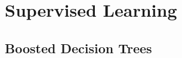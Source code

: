 

\section{Supervised Learning}
\label{ml:supervised}



\subsection{Boosted Decision Trees}
\label{ml:supervised:BDT}
\xgboost \cite{xgboost}



